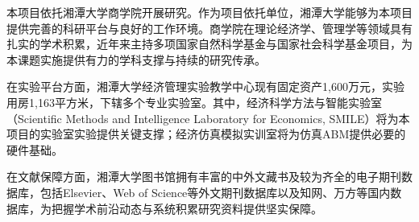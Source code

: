 
本项目依托湘潭大学商学院开展研究。作为项目依托单位，湘潭大学能够为本项目提供完善的科研平台与良好的工作环境。商学院在理论经济学、管理学等领域具有扎实的学术积累，近年来主持多项国家自然科学基金与国家社会科学基金项目，为本课题实施提供有力的学科支撑与持续的研究传承。

在实验平台方面，湘潭大学经济管理实验教学中心现有固定资产1,600万元，实验用房1,163平方米，下辖多个专业实验室。其中，经济科学方法与智能实验室（Scientific Methods and Intelligence Laboratory for Economics, SMILE）将为本项目的实验室实验提供关键支撑；经济仿真模拟实训室将为仿真ABM提供必要的硬件基础。

在文献保障方面，湘潭大学图书馆拥有丰富的中外文藏书及较为齐全的电子期刊数据库，包括Elsevier、Web of Science等外文期刊数据库以及知网、万方等国内数据库，为把握学术前沿动态与系统积累研究资料提供坚实保障。






